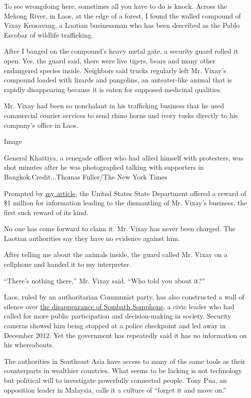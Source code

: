 To see wrongdoing here, sometimes all you have to do is knock. Across
the Mekong River, in Laos, at the edge of a forest, I found the walled
compound of Vixay Keosavang, a Laotian businessman who has been
described as the Pablo Escobar of wildlife trafficking.

After I banged on the compound's heavy metal gate, a security guard
rolled it open. Yes, the guard said, there were live tigers, bears and
many other endangered species inside. Neighbors said trucks regularly
left Mr. Vixay's compound loaded with lizards and pangolins, an
anteater-like animal that is rapidly disappearing because it is eaten
for supposed medicinal qualities.

Mr. Vixay had been so nonchalant in his trafficking business that he
used commercial courier services to send rhino horns and ivory tusks
directly to his company's office in Laos.

Image

General Khattiya, a renegade officer who had allied himself with
protesters, was shot minutes after he was photographed talking with
supporters in Bangkok.Credit...Thomas Fuller/The New York Times

Prompted by
\href{http://www.nytimes.com/2013/03/04/world/asia/notorious-figure-in-animal-smuggling-beyond-reach-in-laos.html}{my
article}, the United States State Department offered a reward of \$1
million for information leading to the dismantling of Mr. Vixay's
business, the first such reward of its kind.

No one has come forward to claim it. Mr. Vixay has never been charged.
The Laotian authorities say they have no evidence against him.

After telling me about the animals inside, the guard called Mr. Vixay on
a cellphone and handed it to my interpreter.

``There's nothing there,'' Mr. Vixay said. ``Who told you about it?''

Laos, ruled by an authoritarian Communist party, has also constructed a
wall of silence over
\href{http://www.nytimes.com/2013/01/11/world/asia/with-laos-disappearance-signs-of-a-liberalization-in-backslide.html}{the
disappearance of Sombath Somphone}, a civic leader who had called for
more public participation and decision-making in society. Security
cameras showed him being stopped at a police checkpoint and led away in
December 2012. Yet the government has repeatedly said it has no
information on his whereabouts.

The authorities in Southeast Asia have access to many of the same tools
as their counterparts in wealthier countries. What seems to be lacking
is not technology but political will to investigate powerfully connected
people. Tony Pua, an opposition leader in Malaysia, calls it a culture
of ``forget it and move on.''

